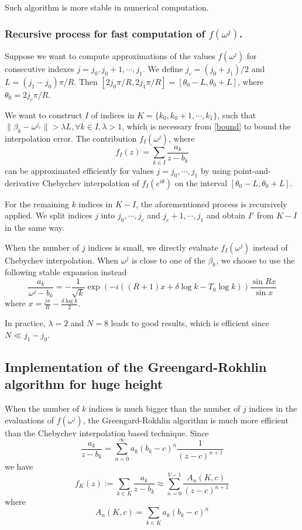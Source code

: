 \documentclass[conference,9pt]{IEEEtran}
\theoremstyle{definition}
\begin{document}
Such algorithm is more stable in numerical computation.
\subsubsection{Recursive process for fast computation of $f(\omega^j)$.}
Suppose we want to compute approximations of the values $f(\omega^j)$ for consecutive indexes $j = j_0, j_0 + 1,\cdots, j_1$. We define $j_c=(j_0+j_1)/2$ and $L=(j_1-j_0)\pi/R$. Then $[2j_0\pi/R,2j_1\pi/R]=[\theta_0-L,\theta_0+L]$, where $\theta_0=2j_c\pi/R$.

We want to construct $I$ of indices in $K=\{k_0,k_0+1,\cdots,k_1\}$, such that $\|\beta_k-\omega^{j_c}\|>\lambda L,\forall k\in I,\lambda>1$, which is necessary from \ref{bound} to bound the interpolation error. The contribution $f_I(\omega^j)$, where
$$f_I(z)=\sum_{k\in I}\frac{a_k}{z-b_k}$$
can be approximated efficiently for values $j=j_0,\cdots,j_1$ by using point-and-derivative Chebychev interpolation of $f_I(e^{i\theta})$ on the interval $[\theta_0-L,\theta_0+L]$. 

For the remaining $k$ indices in $K-I$, the aforementioned process is recursively applied. We split indices $j$ into $j_0,\cdots,j_c$ and $j_c+1,\cdots,j_1$ and obtain $I'$ from $K-I$ in the same way. 

When the number of $j$ indices is small, we directly evaluate $f_I(\omega^j)$ instead of Chebychev interpolation. When $\omega^j$ is close to one of the $\beta_k$, we choose to use the following stable expansion instead
\begin{equation}
    \label{stabexpan}
    \frac{a_k}{\omega^j-b_k}=-\frac{1}{\sqrt{k}}\exp(-i((R+1)x+\delta\log k-T_0\log k))\frac{\sin Rx}{\sin x}
\end{equation}
where
$x=\frac{j\pi}{R}-\frac{\delta\log k}{2}$.

In practice, $\lambda=2$ and $N=8$ leads to good results, which is efficient since $N\ll j_1-j_0$.
\subsection{Implementation of the Greengard-Rokhlin algorithm for huge height}
When the number of $k$ indices is much bigger than the number of $j$ indices in the evaluations of $f(\omega^j)$, the Greengard-Rokhlin algorithm is much more efficient than the Chebychev interpolation based technique. Since
\begin{equation*}
    \frac{a_k}{z-b_k}=\sum_{n=0}^\infty a_k(b_k-c)^n\frac{1}{(z-c)^{n+1}}
\end{equation*}
we have
\begin{equation}
    \label{taylorapprox}
    f_K(z):=\sum_{k\in K}\frac{a_k}{z-b_k}\approx\sum_{n=0}^{V-1}\frac{A_n(K,c)}{(z-c)^{n+1}}
\end{equation}
where
\begin{equation}
    \label{directAn}
    A_n(K,c)=\sum_{k\in K}a_k(b_k-c)^n    
\end{equation}
\end{document}
